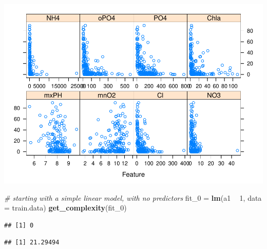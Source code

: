 \documentclass[]{report}
\newenvironment{Shaded}{\begin{snugshade}}{\end{snugshade}}
\newcommand{\KeywordTok}[1]{\textcolor[rgb]{0.13,0.29,0.53}{\textbf{#1}}}
\newcommand{\DataTypeTok}[1]{\textcolor[rgb]{0.13,0.29,0.53}{#1}}
\newcommand{\DecValTok}[1]{\textcolor[rgb]{0.00,0.00,0.81}{#1}}
\newcommand{\StringTok}[1]{\textcolor[rgb]{0.31,0.60,0.02}{#1}}
\newcommand{\CommentTok}[1]{\textcolor[rgb]{0.56,0.35,0.01}{\textit{#1}}}
\newcommand{\OperatorTok}[1]{\textcolor[rgb]{0.81,0.36,0.00}{\textbf{#1}}}
\newcommand{\NormalTok}[1]{#1}
\begin{document}
\includegraphics{MyBook_files/figure-latex/unnamed-chunk-164-1.pdf}

\begin{Shaded}
\begin{Highlighting}[]
\CommentTok{# starting with a simple linear model, with no predictors}
\NormalTok{fit_}\DecValTok{0}\NormalTok{ =}\StringTok{ }\KeywordTok{lm}\NormalTok{(a1 }\OperatorTok{~}\StringTok{ }\DecValTok{1}\NormalTok{, }\DataTypeTok{data =}\NormalTok{ train.data)}
\KeywordTok{get_complexity}\NormalTok{(fit_}\DecValTok{0}\NormalTok{)}
\end{Highlighting}
\end{Shaded}

\begin{verbatim}
## [1] 0
\end{verbatim}

\begin{Shaded}
\end{Shaded}

\begin{verbatim}
## [1] 21.29494
\end{verbatim}

\begin{Shaded}
\end{Shaded}
\end{document}
